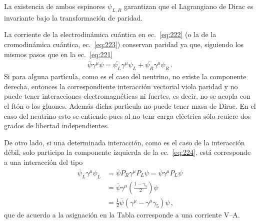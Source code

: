 La existencia de ambos espinores $\psi_{L,R}$ garantizan que el Lagrangiano de Dirac es invariante bajo la transformaci\'on de paridad. 

La corriente de la electrodin\'amica cu\'antica en ec.~\eqref{eq:222} (o la de la cromodin\'amica cu\'antica, ec.~\eqref{eq:223}) conservan paridad ya que, siguiendo los mismos pasos que en la ec.~\eqref{eq:221}
\begin{align}
  \label{eq:224}
  \overline{\psi}\gamma^\mu\psi=\overline{\psi_L}\gamma^\mu\psi_L+\overline{\psi_R}\gamma^\mu\psi_R\,.
\end{align}
Si para alguna part\'\i cula, como es el caso del neutrino, no existe la componente derecha, entonces la correspondiente interacci\'on vectorial viola paridad y no puede tener interacciones electromagn\'eticas ni fuertes, es decir, no se acopla con el ft\'on o los gluones. Adem\'as dicha part\'\i cula no puede tener masa de Dirac. En el caso del neutrino esto se entiende pues al no tenr carga el\'ectrica s\'olo reuiere dos grados de libertad independientes.

De otro lado, si una determinada interacci\'on, como es el caso de la interacci\'on d\'ebil, solo participa la componente izquierda de la ec.~\eqref{eq:224}, est\'a corresponde a una interacci\'on del tipo
\begin{align}
  \overline{\psi}_L\gamma^\mu\psi_L&=\overline{\psi}P_R\gamma^\mu P_L\psi=\overline{\psi}\gamma^\mu P_L\psi\nonumber\\
  &=\overline{\psi}\gamma^\mu\left(\frac{1-\gamma_5}{2}\right)\psi\nonumber\\
  &=\tfrac{1}{2}\overline{\psi}\left(\gamma^\mu-\gamma^\mu\gamma_5\right)\psi\,,
\end{align}
que de acuerdo a la asignaci\'on en la Tabla corresponde a una corriente V--A. 





